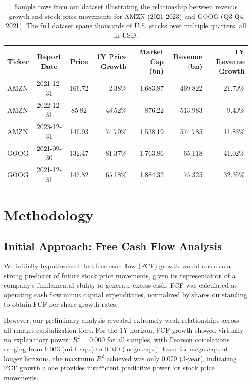 \documentclass[11pt]{article}
\begin{document}
\begin{table}[!htbp]
  \setlength{\tabcolsep}{4pt}
  \centering
\caption{Sample rows from our dataset illustrating the relationship between revenue growth and stock price movements for AMZN (2021-2023) and GOOG (Q3-Q4 2021). The full dataset spans thousands of U.S. stocks over multiple quarters, all in USD.}
  \label{tab:sample-data}
  \begin{tabular}{lccrrrr}
    \toprule
    Ticker & Report Date & Price & 1Y Price Growth & Market Cap (bn) & Revenue (bn) & 1Y Revenue Growth \\
    \midrule
    AMZN & 2021-12-31 & 166.72 & 2.38\%   & 1,683.87 & 469.822 &  21.70\% \\
    AMZN & 2022-12-31 &  85.82 & -48.52\% &   876.22 & 513.983 &   9.40\% \\
    AMZN & 2023-12-31 & 149.93 & 74.70\%  & 1,538.19 & 574.785 &  11.83\% \\
    \midrule
    GOOG & 2021-09-30 & 132.47 & 81.37\%  & 1,763.86 & 65.118 &   41.02\% \\
    GOOG & 2021-12-31 & 143.82 & 65.18\%  & 1,884.32 & 75.325 &   32.35\% \\
    \bottomrule
  \end{tabular}
\end{table}

\section{Methodology}

\subsection{Initial Approach: Free Cash Flow Analysis}

We initially hypothesized that free cash flow (FCF) growth would serve as a strong predictor of future stock price movements, given its representation of a company's fundamental ability to generate excess cash. FCF was calculated as operating cash flow minus capital expenditures, normalized by shares outstanding to obtain FCF per share growth rates.

However, our preliminary analysis revealed extremely weak relationships across all market capitalization tiers. For the 1Y horizon, FCF growth showed virtually no explanatory power: $R^2 = 0.000$ for all samples, with Pearson correlations ranging from 0.003 (mid-caps) to 0.040 (mega-caps). Even for mega-caps at longer horizons, the maximum $R^2$ achieved was only 0.029 (3-year), indicating FCF growth alone provides insufficient predictive power for stock price movements.
\end{document}
